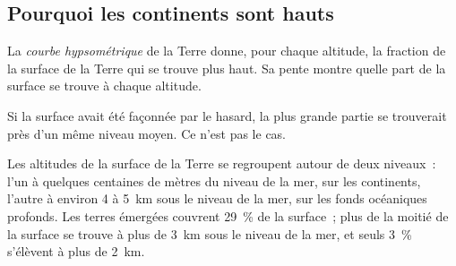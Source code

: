 \subsection{Pourquoi les continents sont hauts}

\begin{definition}\label{def:g11:lithosphere-asthenosphere:hypsometry}
La \emph{courbe hypsométrique}
de la Terre donne, pour chaque altitude, la fraction de la
surface de la Terre qui se trouve plus haut. Sa pente montre quelle part de
la surface se trouve à chaque altitude.
\end{definition}

Si la surface avait été façonnée par le hasard, la plus grande partie se
trouverait près d'un même niveau moyen. Ce n'est pas le cas.

\begin{proposition}\label{prop:g11:lithosphere-asthenosphere:two-levels}
Les altitudes de la surface de la Terre se regroupent autour de deux
niveaux~: l'un à quelques centaines de mètres du niveau de la mer, sur les
continents, l'autre à environ 4 à \qty{5}{km} sous le niveau de la mer, sur
les fonds océaniques profonds. Les terres émergées couvrent
\qty{29}{\percent} de la surface~; plus de la moitié de la surface se trouve
à plus de \qty{3}{km} sous le niveau de la mer, et seuls \qty{3}{\percent}
s'élèvent à plus de \qty{2}{km}.
\end{proposition}

